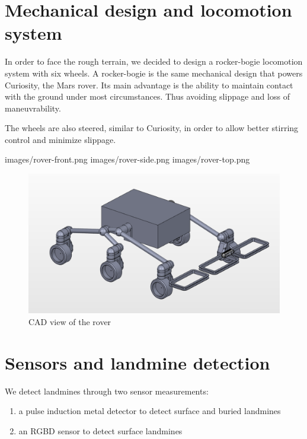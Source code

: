 \section{Mechanical design and locomotion system}
In order to face the rough terrain, we decided to design a rocker-bogie locomotion system with six wheels.
A rocker-bogie is the same mechanical design that powers Curiosity, the Mars rover.
Its main advantage is the ability to maintain contact with the ground under most circumstances.
Thus avoiding slippage and loss of maneuvrability.

The wheels are also steered, similar to Curiosity, in order to allow better stirring control and minimize slippage.

images/rover-front.png
images/rover-side.png
images/rover-top.png

\begin{figure}[htbp]
   \caption{\label{fig:rover} CAD view of the rover}
   \includegraphics[width=\textwidth]{images/rover}
\end{figure}

\section{Sensors and landmine detection}
We detect landmines through two sensor measurements:
\begin{enumerate}
    \item a pulse induction metal detector to detect surface and buried landmines
    \item an RGBD sensor to detect surface landmines
\end{enumerate}

